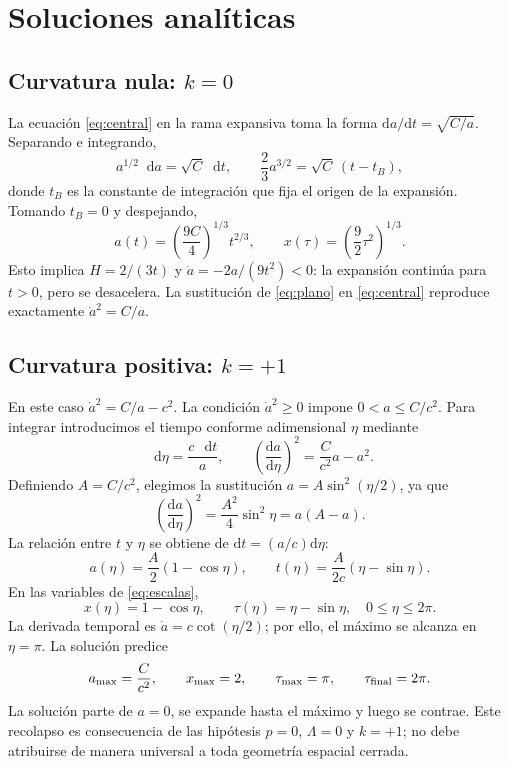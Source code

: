 \documentclass[letterpaper,11pt]{article}
\newcommand{\td}{\mathrm{d}}
\newcommand{\dd}{\mathop{}\!\mathrm{d}}
\begin{document}
\section{Soluciones analíticas}

\subsection{Curvatura nula: $k=0$}

La ecuación \eqref{eq:central} en la rama expansiva toma la forma $\td a/\td t=\sqrt{C/a}$. Separando e integrando,
\[
a^{1/2}\dd a=\sqrt C\dd t,
\qquad \frac{2}{3}a^{3/2}=\sqrt C\,(t-t_B),
\]
donde $t_B$ es la constante de integración que fija el origen de la expansión. Tomando $t_B=0$ y despejando,
\begin{equation}
\boxed{a(t)=\left(\frac{9C}{4}\right)^{1/3}t^{2/3},\qquad
x(\tau)=\left(\frac{9}{2}\tau^2\right)^{1/3}.}
\label{eq:plano}
\end{equation}
Esto implica $H=2/(3t)$ y $\ddot a=-2a/(9t^2)<0$: la expansión continúa para $t>0$, pero se desacelera. La sustitución de \eqref{eq:plano} en \eqref{eq:central} reproduce exactamente $\dot a^2=C/a$.

\subsection{Curvatura positiva: $k=+1$}

En este caso $\dot a^2=C/a-c^2$. La condición $\dot a^2\geq0$ impone $0<a\leq C/c^2$. Para integrar introducimos el tiempo conforme adimensional $\eta$ mediante
\[
\dd\eta=\frac{c\,\dd t}{a},\qquad
\left(\frac{\td a}{\td\eta}\right)^2=\frac{C}{c^2}a-a^2.
\]
Definiendo $A=C/c^2$, elegimos la sustitución $a=A\sin^2(\eta/2)$, ya que
\[
\left(\frac{\td a}{\td\eta}\right)^2
=\frac{A^2}{4}\sin^2\eta
=a(A-a).
\]
La relación entre $t$ y $\eta$ se obtiene de $\td t=(a/c)\td\eta$:
\begin{equation}
\boxed{a(\eta)=\frac{A}{2}(1-\cos\eta),\qquad
 t(\eta)=\frac{A}{2c}(\eta-\sin\eta).}
\label{eq:cerradofis}
\end{equation}
En las variables de \eqref{eq:escalas},
\begin{equation}
\boxed{x(\eta)=1-\cos\eta,\qquad \tau(\eta)=\eta-\sin\eta,\quad 0\leq\eta\leq2\pi.}
\label{eq:cerrado}
\end{equation}
La derivada temporal es $\dot a=c\cot(\eta/2)$; por ello, el máximo se alcanza en $\eta=\pi$. La solución predice
\begin{equation}
a_{\max}=\frac{C}{c^2},\qquad
x_{\max}=2,\qquad
\tau_{\max}=\pi,\qquad
\tau_{\rm final}=2\pi.
\label{eq:maximo}
\end{equation}
La solución parte de $a=0$, se expande hasta el máximo y luego se contrae. Este recolapso es consecuencia de las hipótesis $p=0$, $\Lambda=0$ y $k=+1$; no debe atribuirse de manera universal a toda geometría espacial cerrada.
\end{document}
